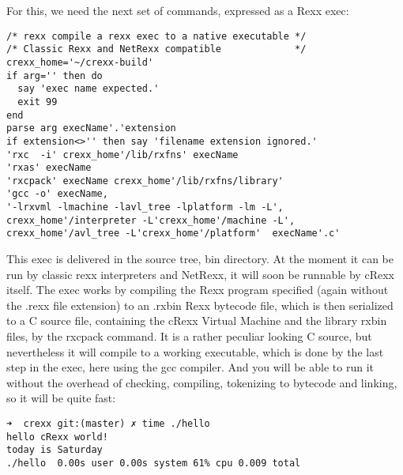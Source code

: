 For this, we need the next set of commands, expressed as a Rexx exec:

\begin{verbatim}
/* rexx compile a rexx exec to a native executable */
/* Classic Rexx and NetRexx compatible             */
crexx_home='~/crexx-build'
if arg='' then do
  say 'exec name expected.'
  exit 99
end
parse arg execName'.'extension
if extension<>'' then say 'filename extension ignored.'
'rxc  -i' crexx_home'/lib/rxfns' execName
'rxas' execName
'rxcpack' execName crexx_home'/lib/rxfns/library'
'gcc -o' execName,
'-lrxvml -lmachine -lavl_tree -lplatform -lm -L',
crexx_home'/interpreter -L'crexx_home'/machine -L',
crexx_home'/avl_tree -L'crexx_home'/platform'  execName'.c'
\end{verbatim}

This exec is delivered in the source tree, bin directory. At the moment
it can be run by classic rexx interpreters and NetRexx, it will soon be
runnable by cRexx itself. The exec works by compiling the Rexx program
specified (again without the .rexx file extension) to an .rxbin Rexx
bytecode file, which is then serialized to a C source file, containing
the cRexx Virtual Machine and the library rxbin files, by the rxcpack
command. It is a rather peculiar looking C source, but nevertheless it
will compile to a working executable, which is done by the last step in
the exec, here using the gcc compiler. And you will be able to run it
without the overhead of checking, compiling, tokenizing to bytecode and
linking, so it will be quite fast:

\begin{verbatim}
➜  crexx git:(master) ✗ time ./hello
hello cRexx world!
today is Saturday
./hello  0.00s user 0.00s system 61% cpu 0.009 total
\end{verbatim}
